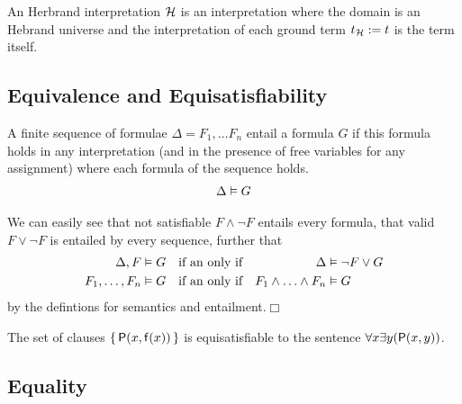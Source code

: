 \begin{definition}
	An {\myem Herbrand interpretation} ${\mathcal H}$ is an interpretation where the domain 
	is an Hebrand universe
	and the interpretation of each ground term $t_{\mathcal H} := t$ is the term itself.
\end{definition}

\subsection{Equivalence and Equisatisfiability}

\begin{definition}[Entailment]
	A finite sequence of formulae $\Delta = F_1, \ldots F_n$ entail a formula $G$
	if this formula holds in any interpretation (and in the presence of free variables for any assignment) 
	where each formula of the sequence holds. 
	\begin{gather*}
	\Delta \vDash G
	\end{gather*}
	
\end{definition}

\begin{lemma}
	We can easily see that not satisfiable $F\land\lnot F$ entails every formula,
	that valid $F\lor\lnot F$ is entailed by every sequence, further that
	\begin{align*}
	\Delta, F&\vDash G  &\text{if an only if} && \Delta &\vDash \lnot F\lor G \\
	F_1,\ldots,F_n&\vDash G  &\text{if an only if} && F_1\land\ldots\land F_n&\vDash G
	\end{align*} 
	by the defintions for semantics and entailment.\hfill$\Box$
\end{lemma}

\begin{definition}[Equivalence]
\end{definition}

\begin{definition}[Equisatisfiability]
\end{definition}


\begin{example}
	The set of clauses $\{\,{\mathsf P}(x, {\mathsf f}(x))\,\}$ is equisatisfiable 
	to the sentence $\forall x\exists y({\mathsf P}(x,y))$.
\end{example}



\subsection{Equality}

